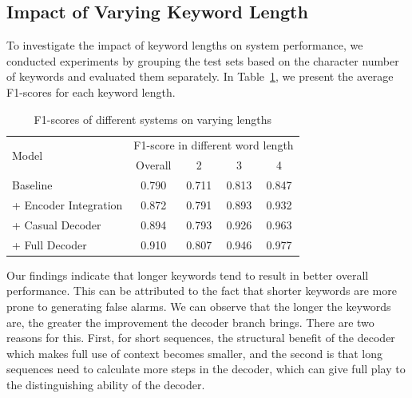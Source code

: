 \documentclass{article}
\begin{document}
\subsection{Impact of Varying Keyword Length}
To investigate the impact of keyword lengths on system performance, we conducted experiments by grouping the test sets based on the character number of keywords and evaluated them separately. In Table~\ref{tab:len}, we present the average F1-scores for each keyword length.
\begin{table}[t]
\caption{F1-scores of different systems on varying lengths}
\begin{tabular}{lcccc}
\toprule
\multirow{2}{*}{Model} & \multicolumn{4}{c}{F1-score in different word length} \\ 
                       & Overall    & 2        & 3        & 4   \\ \midrule
Baseline               &   0.790    & 0.711    &0.813        &0.847     \\
\hspace{0.5em}+ Encoder Integration   &   0.872    &  0.791   &0.893     & 0.932    \\
\hspace{1em}+ Casual Decoder       &   0.894    &  0.793   &0.926     & 0.963    \\
\hspace{1em}+ Full Decoder         &   0.910    &  0.807   &0.946     & 0.977    \\ \bottomrule
\end{tabular}
\label{tab:len}
\end{table}
Our findings indicate that longer keywords tend to result in better overall performance. This can be attributed to the fact that shorter keywords are more prone to generating false alarms. We can observe that the longer the keywords are, the greater the improvement the decoder branch brings.
There are two reasons for this. First, for short sequences, the structural benefit of the decoder which makes full use of context becomes smaller, and the second is that long sequences need to calculate more steps in the decoder, which can give full play to the distinguishing ability of the decoder.
\end{document}
